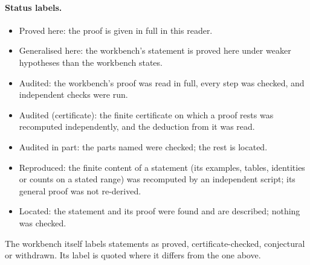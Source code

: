 \paragraph{Status labels.}
\begin{itemize}
\item \textsf{Proved here}: the proof is given in full in this reader.
\item \textsf{Generalised here}: the workbench's statement is proved here under weaker hypotheses than the workbench states.
\item \textsf{Audited}: the workbench's proof was read in full, every step was checked, and independent checks were run.
\item \textsf{Audited (certificate)}: the finite certificate on which a proof rests was recomputed independently, and the deduction from it was read.
\item \textsf{Audited in part}: the parts named were checked; the rest is located.
\item \textsf{Reproduced}: the finite content of a statement (its examples, tables, identities or counts on a stated range) was recomputed by an independent script; its general proof was not re-derived.
\item \textsf{Located}: the statement and its proof were found and are described; nothing was checked.
\end{itemize}
The workbench itself labels statements as proved, certificate-checked, conjectural or withdrawn. Its label is quoted where it differs from the one above.
